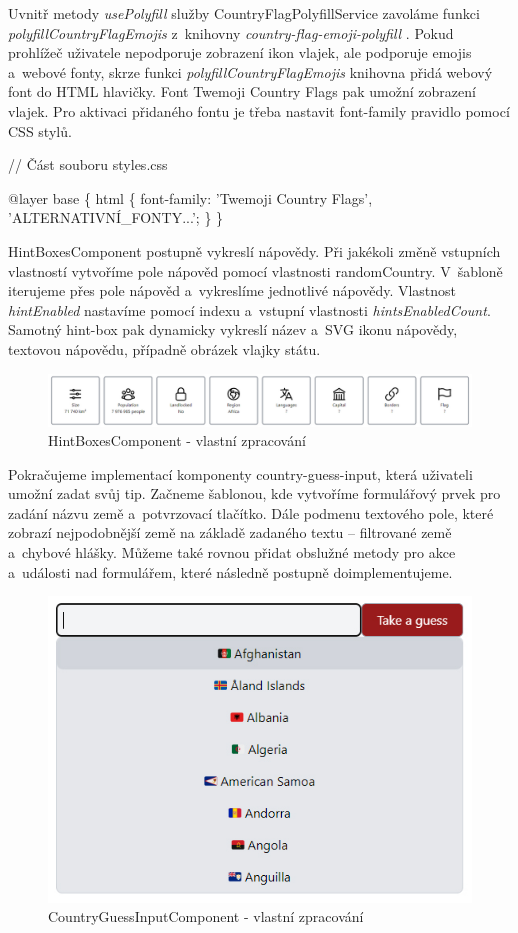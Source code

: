 Uvnitř metody \emph{usePolyfill} služby CountryFlagPolyfillService zavoláme funkci \emph{polyfillCountryFlagEmojis} z~knihovny \emph{country-flag-emoji-polyfill} \cite{countryflagemojipolyfill}. 
Pokud prohlížeč uživatele nepodporuje zobrazení ikon vlajek, ale podporuje emojis a~webové fonty, skrze funkci \emph{polyfillCountryFlagEmojis} knihovna přidá webový font do HTML hlavičky. 
Font Twemoji Country Flags pak umožní zobrazení vlajek. Pro aktivaci přidaného fontu je třeba nastavit font-family pravidlo pomocí CSS stylů.

\begin{prog}
// Část souboru styles.css

@layer base \{
  html \{
    font-family: 'Twemoji Country Flags', 'ALTERNATIVNÍ_FONTY...';
  \}
\}
\end{prog}

HintBoxesComponent postupně vykreslí nápovědy. Při jakékoli změně vstupních vlastností vytvoříme pole nápověd pomocí vlastnosti randomCountry. 
V~šabloně iterujeme přes pole nápověd a~vykreslíme jednotlivé nápovědy. Vlastnost \emph{hintEnabled} nastavíme pomocí indexu a~vstupní vlastnosti \emph{hintsEnabledCount}. 
Samotný hint-box pak dynamicky vykreslí název a~SVG ikonu nápovědy, textovou nápovědu, případně obrázek vlajky státu.

\begin{figure}[htb]
	\centering
		\includegraphics[width=.97\textwidth]{images/HintBoxes.jpg}
	\caption[HintBoxesComponent]{HintBoxesComponent - vlastní zpracování}
	\label{fig:angularhintboxes}
\end{figure}

Pokračujeme implementací komponenty country-guess-input, která uživateli umožní zadat svůj tip. 
Začneme šablonou, kde vytvoříme formulářový prvek pro zadání názvu země a~potvrzovací tlačítko. 
Dále podmenu textového pole, které zobrazí nejpodobnější země na základě zadaného textu -- filtrované země a~chybové hlášky. 
Můžeme také rovnou přidat obslužné metody pro akce a~události nad formulářem, které následně postupně doimplementujeme.

\begin{figure}[htb]
	\centering
		\includegraphics[width=.5\textwidth]{images/CountryGuessInput.jpg}
	\caption[CountryGuessInputComponent]{CountryGuessInputComponent - vlastní zpracování}
	\label{fig:angularcountryguessinput}
\end{figure}

